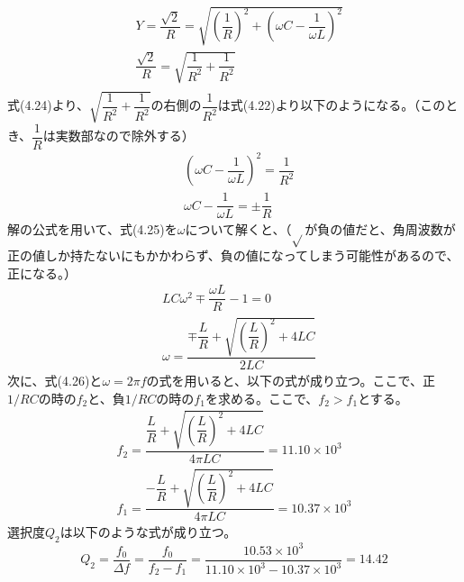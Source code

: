 \documentclass[12pt,a4paper]{jsarticle}
\numberwithin{equation}{section}
\numberwithin{figure}{section}
\numberwithin{table}{section}
\begin{document}
\begin{itemize}
\begin{equation}
\begin{split}
        &Y=\dfrac{\sqrt{2}}{R}=\sqrt{(\dfrac{1}{R})^2 + (\omega C - \dfrac{1}{\omega L})^2}\\
        &\dfrac{\sqrt{2}}{R}=\sqrt{\dfrac{1}{R^2} + \dfrac{1}{R^2}}\\
      \end{split}
    \end{equation}
    式(4.24)より、$\sqrt{\dfrac{1}{R^2} + \dfrac{1}{R^2}}$の右側の$ \dfrac{1}{R^2}$は式(4.22)より以下のようになる。（このとき、$\dfrac{1}{R}$は実数部なので除外する）
    \begin{equation}
      \begin{split}
        &(\omega C - \dfrac{1}{\omega L})^2=\dfrac{1}{R^2}\\
        &\omega C - \dfrac{1}{\omega L}=\pm \dfrac{1}{R}
      \end{split}
    \end{equation}
    解の公式を用いて、式(4.25)を$\omega$について解くと、（$\sqrt{}$が負の値だと、角周波数が正の値しか持たないにもかかわらず、負の値になってしまう可能性があるので、正になる。）
    \begin{equation}
      \begin{split}        
        &LC \omega^2 \mp \dfrac{\omega L }{R} - 1 = 0\\
        &\omega =\dfrac{\mp \dfrac{L}{R} + \sqrt{(\dfrac{L}{R})^2 + 4LC}}{2LC}
      \end{split}
    \end{equation}
    次に、式(4.26)と$\omega = 2 \pi f$の式を用いると、以下の式が成り立つ。ここで、正$1/RC$の時の$f_2$と、負$1/RC$の時の$f_1$を求める。ここで、$f_2 > f_1$とする。
    \begin{equation}
      \begin{split}
        f_2=\dfrac{\dfrac{L}{R} + \sqrt{(\dfrac{L}{R})^2 + 4LC}}{4 \pi LC}=11.10 \times 10^3\\
        f_1=\dfrac{-\dfrac{L}{R} + \sqrt{(\dfrac{L}{R})^2 + 4LC}}{4 \pi LC}=10.37 \times 10^3
      \end{split}
    \end{equation}
    選択度$Q_2$は以下のような式が成り立つ。
    \begin{equation}
      Q_2=\dfrac{f_0}{\Delta f}=\dfrac{f_0}{f_2 - f_1}=\dfrac{10.53 \times 10^3}{11.10 \times 10^3 - 10.37 \times 10^3}=14.42
    \end{equation}
  \end{itemize}

  \newpage
\end{document}
